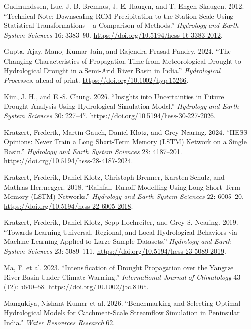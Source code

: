 \documentclass[
  11pt,
]{article}
\newlength{\cslhangindent}
\newenvironment{CSLReferences}[2] %
 {\begin{list}{}{%
  \setlength{\itemindent}{0pt}
  \setlength{\leftmargin}{0pt}
  \setlength{\parsep}{0pt}
  \ifodd #1
   \setlength{\leftmargin}{\cslhangindent}
   \setlength{\itemindent}{-1\cslhangindent}
  \fi
  \setlength{\itemsep}{#2\baselineskip}}}
 {\end{list}}
\begin{document}
\begin{CSLReferences}{1}{1}
Gudmundsson, Luc, J. B. Bremnes, J. E. Haugen, and T. Engen-Skaugen.
2012. {``Technical Note: Downscaling {RCM} Precipitation to the Station
Scale Using Statistical Transformations -- a Comparison of Methods.''}
\emph{Hydrology and Earth System Sciences} 16: 3383--90.
\url{https://doi.org/10.5194/hess-16-3383-2012}.

Gupta, Ajay, Manoj Kumar Jain, and Rajendra Prasad Pandey. 2024. {``The
Changing Characteristics of Propagation Time from Meteorological Drought
to Hydrological Drought in a Semi-Arid River Basin in {India}.''}
\emph{Hydrological Processes}, ahead of print.
\url{https://doi.org/10.1002/hyp.15266}.

Kim, J. H., and E.-S. Chung. 2026. {``Insights into Uncertainties in
Future Drought Analysis Using Hydrological Simulation Model.''}
\emph{Hydrology and Earth System Sciences} 30: 227--47.
\url{https://doi.org/10.5194/hess-30-227-2026}.

Kratzert, Frederik, Martin Gauch, Daniel Klotz, and Grey Nearing. 2024.
{``{HESS Opinions}: Never Train a {Long Short-Term Memory} ({LSTM})
Network on a Single Basin.''} \emph{Hydrology and Earth System Sciences}
28: 4187--201. \url{https://doi.org/10.5194/hess-28-4187-2024}.

Kratzert, Frederik, Daniel Klotz, Christoph Brenner, Karsten Schulz, and
Mathias Herrnegger. 2018. {``Rainfall--Runoff Modelling Using {Long
Short-Term Memory} ({LSTM}) Networks.''} \emph{Hydrology and Earth
System Sciences} 22: 6005--20.
\url{https://doi.org/10.5194/hess-22-6005-2018}.

Kratzert, Frederik, Daniel Klotz, Sepp Hochreiter, and Grey S. Nearing.
2019. {``Towards Learning Universal, Regional, and Local Hydrological
Behaviors via Machine Learning Applied to Large-Sample Datasets.''}
\emph{Hydrology and Earth System Sciences} 23: 5089--111.
\url{https://doi.org/10.5194/hess-23-5089-2019}.

{Ma, F. et al.} 2023. {``Intensification of Drought Propagation over the
{Yangtze River} Basin Under Climate Warming.''} \emph{International
Journal of Climatology} 43 (12): 5640--58.
\url{https://doi.org/10.1002/joc.8165}.

{Mangukiya, Nishant Kumar et al.} 2026. {``Benchmarking and Selecting
Optimal Hydrological Models for Catchment-Scale Streamflow Simulation in
{Peninsular India}.''} \emph{Water Resources Research} 62.


\end{CSLReferences}
\end{document}
